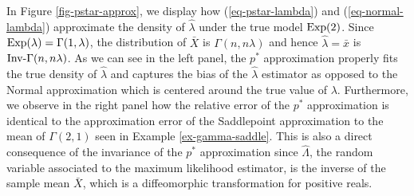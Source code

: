 \begin{example}
    In Figure \ref{fig-pstar-approx}, we display how (\ref{eq-pstar-lambda}) and (\ref{eq-normal-lambda}) approximate the density of $\hat\lambda$ under the true model ${\textrm{Exp}}(2)$. Since ${\textrm{Exp}}(\lambda) = \Gamma(1, \lambda)$, the distribution of $\bar X$ is $\Gamma(n, n\lambda)$ and hence $\hat\lambda = \bar x$ is ${\textrm{Inv-}}\Gamma(n, n\lambda)$. As we can see in the left panel, the $p^*$ approximation properly fits the true density of $\hat\lambda$ and captures the bias of the $\hat\lambda$ estimator as opposed to the Normal approximation which is centered around the true value of $\lambda$. Furthermore, we observe in the right panel how the relative error of the $p^*$ approximation is identical to the approximation error of the Saddlepoint approximation to the mean of $\Gamma(2, 1)$ seen in Example \ref{ex-gamma-saddle}. This is also a direct consequence of the invariance of the $p^*$ approximation since $\hat\Lambda$, the random variable associated to the maximum likelihood estimator, is the inverse of the sample mean $\bar X$, which is a diffeomorphic transformation for positive reals.
    

    

\end{example}

